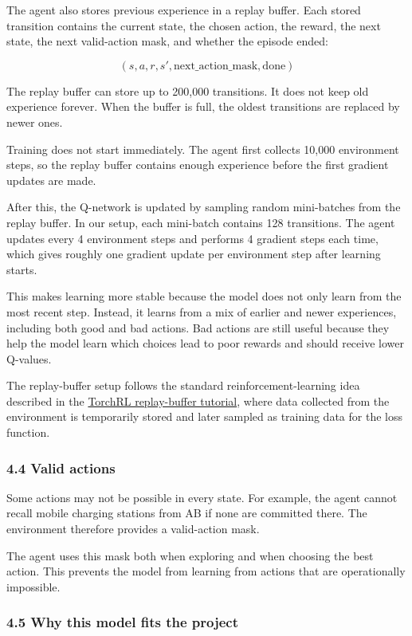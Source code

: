 \documentclass[11pt]{article}
\begin{document}
The agent also stores previous experience in a replay buffer. Each
stored transition contains the current state, the chosen action, the
reward, the next state, the next valid-action mask, and whether the
episode ended:

\[
(s, a, r, s', \text{next\_action\_mask}, \text{done})
\]

The replay buffer can store up to 200,000 transitions. It does not keep
old experience forever. When the buffer is full, the oldest transitions
are replaced by newer ones.

Training does not start immediately. The agent first collects 10,000
environment steps, so the replay buffer contains enough experience
before the first gradient updates are made.

After this, the Q-network is updated by sampling random mini-batches
from the replay buffer. In our setup, each mini-batch contains 128
transitions. The agent updates every 4 environment steps and performs 4
gradient steps each time, which gives roughly one gradient update per
environment step after learning starts.

This makes learning more stable because the model does not only learn
from the most recent step. Instead, it learns from a mix of earlier and
newer experiences, including both good and bad actions. Bad actions are
still useful because they help the model learn which choices lead to
poor rewards and should receive lower Q-values.

The replay-buffer setup follows the standard reinforcement-learning idea
described in the
\href{https://docs.pytorch.org/rl/0.4/tutorials/rb_tutorial.html}{TorchRL
replay-buffer tutorial}, where data collected from the environment is
temporarily stored and later sampled as training data for the loss
function.

\subsubsection{4.4 Valid actions}\label{valid-actions}

Some actions may not be possible in every state. For example, the agent
cannot recall mobile charging stations from AB if none are committed
there. The environment therefore provides a valid-action mask.

The agent uses this mask both when exploring and when choosing the best
action. This prevents the model from learning from actions that are
operationally impossible.

\subsubsection{4.5 Why this model fits the
project}\label{why-this-model-fits-the-project}
\end{document}
